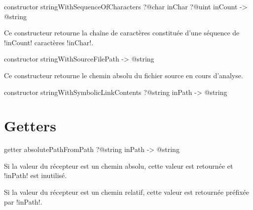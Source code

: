 
\begin{galgasbox}
constructor stringWithSequenceOfCharacters
  ?@char inChar
  ?@uint inCount
  -> @string
\end{galgasbox}

Ce constructeur retourne la chaîne de caractères constituée d'une séquence de \ggs!inCount! caractères \ggs!inChar!.






\begin{galgasbox}
constructor stringWithSourceFilePath -> @string
\end{galgasbox}

Ce constructeur retourne le chemin absolu du fichier source en cours d'analyse.







\begin{galgasbox}
constructor stringWithSymbolicLinkContents ?@string inPath -> @string
\end{galgasbox}



















\section{Getters}


\begin{galgasbox}
getter absolutePathFromPath ?@string inPath -> @string
\end{galgasbox}

Si la valeur du récepteur est un chemin absolu, cette valeur est retournée et \ggs!inPath! est inutilisé.

Si la valeur du récepteur est un chemin relatif, cette valeur est retournée préfixée par \ggs!inPath!.




